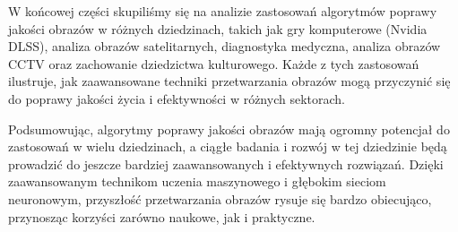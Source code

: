 \documentclass[10pt]{article}
\begin{document}
W końcowej części skupiliśmy się na analizie zastosowań algorytmów poprawy jakości obrazów w różnych dziedzinach, takich jak gry komputerowe (Nvidia DLSS), analiza obrazów satelitarnych, diagnostyka medyczna, analiza obrazów CCTV oraz zachowanie dziedzictwa kulturowego. Każde z tych zastosowań ilustruje, jak zaawansowane techniki przetwarzania obrazów mogą przyczynić się do poprawy jakości życia i efektywności w różnych sektorach.

Podsumowując, algorytmy poprawy jakości obrazów mają ogromny potencjał do zastosowań w wielu dziedzinach, a ciągłe badania i rozwój w tej dziedzinie będą prowadzić do jeszcze bardziej zaawansowanych i efektywnych rozwiązań. Dzięki zaawansowanym technikom uczenia maszynowego i głębokim sieciom neuronowym, przyszłość przetwarzania obrazów rysuje się bardzo obiecująco, przynosząc korzyści zarówno naukowe, jak i praktyczne.
\end{document}
